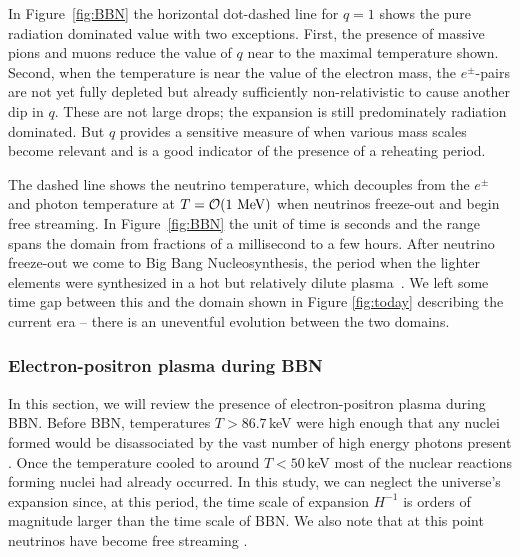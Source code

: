  In Figure~\ref{fig:BBN} the horizontal dot-dashed line for $q=1$ shows the pure radiation dominated value with two exceptions. First, the presence of massive pions and muons reduce the value of $q$ near to the maximal temperature shown. Second, when the temperature is near the value of the electron mass, the $e^\pm$-pairs are not yet fully depleted but already sufficiently non-relativistic to cause another dip in $q$. These are not large drops; the expansion is still predominately radiation dominated. But $q$ provides a sensitive measure of when various mass scales become relevant and is a good indicator of the presence of a reheating period.

 The dashed line shows the neutrino temperature, which decouples from the $e^\pm$ and photon temperature at $T={\cal O}(1\MeV)$ when neutrinos freeze-out and begin free streaming. In Figure~\ref{fig:BBN} the unit of time is seconds and the range spans the domain from fractions of a millisecond to a few hours. After neutrino freeze-out we come to Big Bang Nucleosynthesis, the period when the lighter elements were synthesized in a hot but relatively dilute plasma~\cite{Iocco:2008va}. We left some time gap between this and the domain shown in Figure \ref{fig:today} describing the current era -- there is an uneventful evolution between the two domains. 
 


\subsubsection{Electron-positron plasma during BBN}
\label{sec:density}
In this section, we will review the presence of electron-positron plasma during BBN. Before BBN, temperatures $T>86.7\,$keV were high enough that any nuclei formed would be disassociated by the vast number of high energy photons present \cite{Pitrou:2018cgg}. Once the temperature cooled to around $T<50\,$keV most of the nuclear reactions forming nuclei had already occurred. In this study, we can neglect the universe's expansion since, at this period, the time scale of expansion $H^{-1}$ is orders of magnitude larger than the time scale of BBN. We also note that at this point neutrinos have become free streaming \cite{Birrell:2012gg}.

